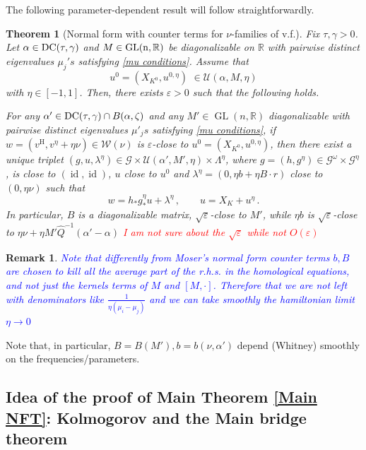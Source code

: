 \documentclass[oneside, 11pt]{amsbook}
\def\a{\alpha}
\newcommand{\U}{\mathcal{U}}
\newcommand{\R}{\mathbb{R}}
\newcommand{\eps}{\varepsilon}
\newcommand{\GL}{\operatorname{GL}}
\newcommand{\vh}{v^{\text{H}}} %
\newcommand{\id}{\operatorname{id}}
\def\U{{\mathcal U}}
\newcommand{\cG}{{\mathcal G}}
\newcommand{\cU}{{\mathcal U}}
\newcommand{\cW}{{\mathcal W}}
\newcommand{\al}{{\alpha}}
\newcommand{\0}{{(0)}}
\newcommand{\3}{{(3)}}
\newcommand{\red}[1]{\textcolor{red}{#1}}
\newcommand{\blue}[1]{\textcolor{blue}{#1}}
\newtheorem{thm}{Theorem}[section]
\newtheorem{rmk}{Remark}[section]
\numberwithin{equation}{section}
\numberwithin{defn}{section}
\numberwithin{prop}{section}
\numberwithin{cor}{section}
\numberwithin{lemma}{section}
\numberwithin{rmk}{section}
\numberwithin{corollary}{section}
\begin{document}
The following parameter-dependent result will follow straightforwardly. 

\begin{thm}[Normal form with counter terms for $\nu$-families of v.f.]\label{thm NF parameters}
Fix  $\tau,\gamma>0$. Let $\a \in {\rm DC}(\tau,\gamma)$ and $M \in {\rm GL(n,\R)}$ be diagonalizable on $\R$ with pairwise distinct eigenvalues $\mu_j's$ satisfying \eqref{mu conditions}.
Assume that 
$$
u^0 = (X_{K^0}, u^{0,\eta}) \,\,\in \U(\alpha,M, \eta)
$$ with $\eta \in [-1,1]$. 
 Then, there exists $\eps>0$ such that the following holds.

\smallskip
  For any $\al' \in {\rm DC}(\tau,\gamma) \cap B(\alpha,\zeta)$ and any $M'\in\GL(n,\R)$ diagonalizable with pairwise distinct eigenvalues $\mu'_js$ satisfying \eqref{mu conditions}, if $w=(\vh, v^\eta + \eta\nu)\in\cW(\nu)$ is $\eps$-close to $u^0 = (X_{K^0}, u^{0,\eta}) $, then there exist a unique triplet $(g,u,\lambda^\eta)\in\cG\times\cU(\alpha',M',\eta)\times \Lambda^\eta$, where $g=(h,g^\eta)\in\cG^\omega\times\cG^\eta$, is close to $(\id,\id)$, $u$ close to $u^0$ and $\lambda^\eta = (0, \eta b + \eta B\cdot r)$  close to $(0,\eta\nu)$  such that 
  \begin{equation}
  	w = h_* g^\eta_* u  + \lambda^\eta\,,\quad \quad u = X_K + u^\eta\,.
  \end{equation}
In particular, $B$ is a diagonalizable matrix,  $\sqrt{\eps}$-close to $M'$, while $\eta b$ is $\sqrt{\eps}$-close to  $\eta\nu+\eta M'\widehat{Q}^{-1}(\al'-\alpha)$ \red{I am not sure about the $\sqrt{\eps}$ while not $O(\eps)$}
\end{thm}


\begin{rmk}
 \blue{Note that differently from Moser's normal form counter terms $b, B$ are chosen to kill all the average part of the r.h.s. in the homological equations, and not just the kernels terms of $M$ and $[M,\cdot]$. Therefore that we are not left with denominators like $\frac{1}{\eta(\mu_i - \mu_j)}$ and we can take smoothly the hamiltonian limit $\eta\to 0$ } 
 \end{rmk} 

Note that, in particular, $B = B(M'), b = b(\nu, \alpha')$ depend (Whitney) smoothly on the frequencies/parameters. 

\medskip

\subsection{Idea of the proof of Main Theorem \ref{Main NFT}: Kolmogorov and the Main bridge theorem}
\end{document}
